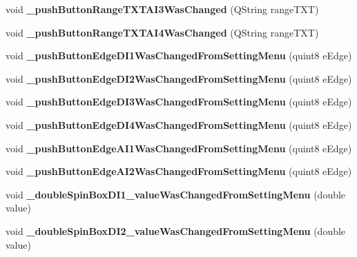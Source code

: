 \begin{DoxyCompactItemize}
void {\bfseries \+\_\+push\+Button\+Range\+T\+X\+T\+A\+I3\+Was\+Changed} (Q\+String range\+T\+XT)
\item 
\mbox{\label{class_setting_window_a65ce5a4d784350811145a49914fadf34}} 
void {\bfseries \+\_\+push\+Button\+Range\+T\+X\+T\+A\+I4\+Was\+Changed} (Q\+String range\+T\+XT)
\item 
\mbox{\label{class_setting_window_ad2d2945f430dbba038dce04441211b27}} 
void {\bfseries \+\_\+push\+Button\+Edge\+D\+I1\+Was\+Changed\+From\+Setting\+Menu} (quint8 e\+Edge)
\item 
\mbox{\label{class_setting_window_a14d9561752286a91e69c868e5046bfe4}} 
void {\bfseries \+\_\+push\+Button\+Edge\+D\+I2\+Was\+Changed\+From\+Setting\+Menu} (quint8 e\+Edge)
\item 
\mbox{\label{class_setting_window_a5639d9416d970bf7c969ac67ac265fa8}} 
void {\bfseries \+\_\+push\+Button\+Edge\+D\+I3\+Was\+Changed\+From\+Setting\+Menu} (quint8 e\+Edge)
\item 
\mbox{\label{class_setting_window_a2a2ad61dce1b3121cc8a791f6c8648f1}} 
void {\bfseries \+\_\+push\+Button\+Edge\+D\+I4\+Was\+Changed\+From\+Setting\+Menu} (quint8 e\+Edge)
\item 
\mbox{\label{class_setting_window_a402cfbd472462999d1fd75b56a38a358}} 
void {\bfseries \+\_\+push\+Button\+Edge\+A\+I1\+Was\+Changed\+From\+Setting\+Menu} (quint8 e\+Edge)
\item 
\mbox{\label{class_setting_window_aaaa028e9d5f99de2aa2a6f436982b017}} 
void {\bfseries \+\_\+push\+Button\+Edge\+A\+I2\+Was\+Changed\+From\+Setting\+Menu} (quint8 e\+Edge)
\item 
\mbox{\label{class_setting_window_abe8a7b84f9517d7f22649788bcb343dc}} 
void {\bfseries \+\_\+double\+Spin\+Box\+D\+I1\+\_\+value\+Was\+Changed\+From\+Setting\+Menu} (double value)
\item 
\mbox{\label{class_setting_window_a3fc40d46be8c7fb9642af6c3982cd9cc}} 
void {\bfseries \+\_\+double\+Spin\+Box\+D\+I2\+\_\+value\+Was\+Changed\+From\+Setting\+Menu} (double value)

\end{DoxyCompactItemize}
